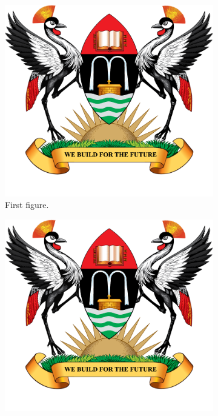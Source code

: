\begin{figure}[h]
     \centering
     \begin{subfigure}[b]{0.3\textwidth}
         \centering
         \includegraphics[width=\textwidth]{images/Mak-Log.png}
         \caption{First figure.}
         \label{fig2a}
     \end{subfigure}
     \hfill
     \begin{subfigure}[b]{0.3\textwidth}
         \centering
         \includegraphics[width=\textwidth]{images/Mak-Log.png}

\end{subfigure}
\end{figure}
